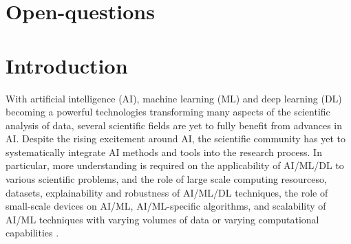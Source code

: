 \documentclass[sigplan,screen]{acmart}
\begin{document}
{\huge\bf \TITLE}


\tableofcontents

\listoffigures
\listoftables


\section{Open-questions}






\clearpage

\maketitle

\section{Introduction}


With artificial intelligence (AI), machine learning (ML) and deep learning (DL) becoming a powerful technologies transforming many aspects of the scientific analysis of data, several scientific fields are yet to fully benefit from advances in AI. Despite the rising excitement around AI, the scientific community has yet to systematically integrate AI methods and tools into the research process. In particular, more understanding is required on the applicability of AI/ML/DL to various scientific problems, and the role of large scale computing resourceso, datasets, explainability and robustness of AI/ML/DL techniques, the role of small-scale devices on AI/ML, AI/ML-specific algorithms, and scalability of AI/ML techniques with varying volumes of data or varying computational capabilities \cite{mlcommons-benchmark-2023}. 
\end{document}
